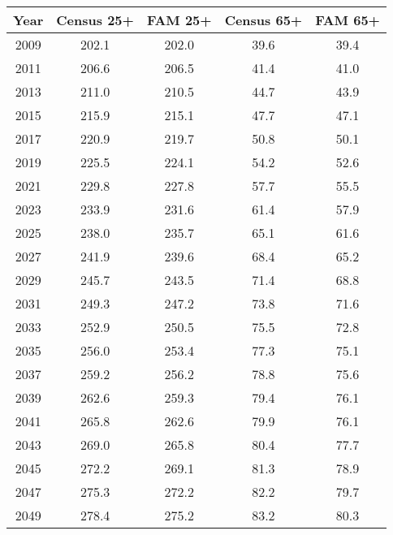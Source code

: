 \begin{tabular} {ccccc}
\toprule
Year & Census 25+ & FAM 25+ & Census 65+ & FAM 65+  \\
\midrule 
2009&202.1&202.0&39.6&39.4\\
2011&206.6&206.5&41.4&41.0\\
2013&211.0&210.5&44.7&43.9\\
2015&215.9&215.1&47.7&47.1\\
2017&220.9&219.7&50.8&50.1\\
2019&225.5&224.1&54.2&52.6\\
2021&229.8&227.8&57.7&55.5\\
2023&233.9&231.6&61.4&57.9\\
2025&238.0&235.7&65.1&61.6\\
2027&241.9&239.6&68.4&65.2\\
2029&245.7&243.5&71.4&68.8\\
2031&249.3&247.2&73.8&71.6\\
2033&252.9&250.5&75.5&72.8\\
2035&256.0&253.4&77.3&75.1\\
2037&259.2&256.2&78.8&75.6\\
2039&262.6&259.3&79.4&76.1\\
2041&265.8&262.6&79.9&76.1\\
2043&269.0&265.8&80.4&77.7\\
2045&272.2&269.1&81.3&78.9\\
2047&275.3&272.2&82.2&79.7\\
2049&278.4&275.2&83.2&80.3\\
\bottomrule 
\end{tabular} 
